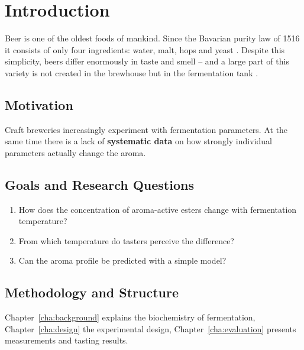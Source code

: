 \chapter{Introduction}
\label{cha:introduction}

Beer is one of the oldest foods of mankind. Since the Bavarian purity law of 1516 it consists of
only four ingredients: water, malt, hops and yeast \citep{hopfner2019reinheit}. Despite this
simplicity, beers differ enormously in taste and smell -- and a large part of this variety is not
created in the brewhouse but in the fermentation tank \citep{malz2021ester}.

\section{Motivation}
Craft breweries increasingly experiment with fermentation parameters. At the same time there is a
lack of \textbf{systematic data} on how strongly individual parameters actually change the aroma.

\section{Goals and Research Questions}
\begin{enumerate}
  \item How does the concentration of aroma-active esters change with fermentation temperature?
  \item From which temperature do tasters perceive the difference?
  \item Can the aroma profile be predicted with a simple model?
\end{enumerate}

\section{Methodology and Structure}
Chapter~\ref{cha:background} explains the biochemistry of fermentation, Chapter~\ref{cha:design}
the experimental design, Chapter~\ref{cha:evaluation} presents measurements and tasting results.

